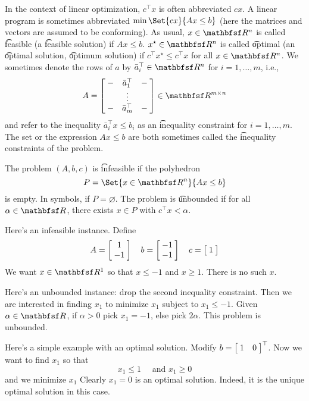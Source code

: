 In the context of linear optimization, $c^\top x$ is often abbreviated $cx$.
A linear program is sometimes abbreviated $\min\Set{cx}{Ax \leq b}$ (here the matrices and vectors are assumed to be conforming).
As usual, $x \in \R ^n$ is called \t{feasible} (a \t{feasible solution}) if $Ax \leq b$.
$x^\star \in \R ^n$ is called \t{optimal} (an \t{optimal solution}, \t{optimum solution}) if $c^\top x^\star \leq c^\top x$ for all $x \in \R ^n$.
We sometimes denote the rows of $a$ by $\bar{a}_i^\top  \in \R ^n$ for $i = 1, \dots , m$, i.e.,
\[
A = \bmat{- & \bar{a}_1^\top  & - \\ &\vdots& \\ - & \bar{a}_m^\top  & - } \in \R ^{m \times  n}
\]
and refer to the inequality $\bar{a}_i^\top  x \leq b_i$ as an \t{inequality constraint} for $i = 1, \dots , m$.
The set or the expression $Ax \leq b$ are both sometimes called the \t{inequality constraints} of the problem.

The problem $(A, b, c)$ is \t{infeasible} if the polyhedron
\[
P = \Set{x \in \R ^n}{Ax \leq b}
\]
is empty.
In symbols, if $P = \varnothing$.
The problem is \t{unbounded} if for all $\alpha  \in \R $, there exists $x \in P$ with $c^\top x < \alpha $.

Here's an infeasible instance. Define
\[
A = \bmat{1 \\ -1} \quad b = \bmat{-1 \\ -1} \quad c = \bmat{1}
\]
We want $x \in \R ^1$ so that $x \leq -1$ and $x \geq 1$.
There is no such $x$.

Here's an unbounded instance: drop the second inequality constraint.
Then we are interested in finding $x_1$ to minimize $x_1$ subject to $x_1 \leq -1$.
Given $\alpha  \in \R $, if $\alpha  > 0$ pick $x_1 = -1$, else pick $2\alpha $.
This problem is unbounded.

Here's a simple example with an optimal solution.
Modify $b = \bmat{1 & 0}^\top $.
Now we want to find $x_1$ so that
\[
x_1 \leq 1 \quad \text{ and } x_1 \geq 0
\]
and we minimize $x_1$
Clearly $x_1 = 0$ is an optimal solution.
Indeed, it is the unique optimal solution in this case.
